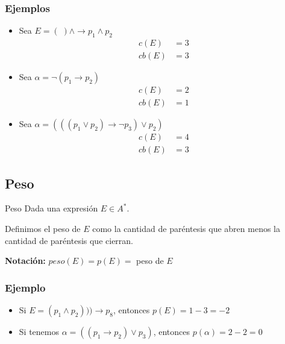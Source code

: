 \subsubsection{Ejemplos}

\begin{itemize}
    \item Sea $E = ( \; ) \wedge \to p_1 \wedge p_2$
        \begin{align*}
            c(E) &= 3 \\
            cb(E) &= 3
        \end{align*}

    \item Sea $\alpha = \neg (p_1 \to p_2)$
        \begin{align*}
            c(E) &= 2 \\
            cb(E) &= 1
        \end{align*}

    \item Sea $\alpha = (((p_1 \vee p_2) \to \neg p_3) \vee p_2)$
        \begin{align*}
            c(E) &= 4 \\
            cb(E) &= 3
        \end{align*}
\end{itemize}

\subsection{Peso}

\begin{definicion}{Peso}{}
    Dada una expresión $E \in A^{*}$.

    \medskip

    Definimos el peso de $E$ como la cantidad de paréntesis que abren menos
    la cantidad de paréntesis que cierran.

    \bigskip
    \textbf{Notación:}
    $peso(E) = p(E) =$ peso de $E$
\end{definicion}

\subsubsection{Ejemplo}

\begin{itemize}
    \item Si $E = ( p_1 \wedge p_2))) \to p_8$, entonces $p(E)=1-3=-2$

    \item Si tenemos $\alpha = ((p_1 \to p_2) \vee p_3)$, entonces
        $p(\alpha) = 2-2=0$
\end{itemize}


